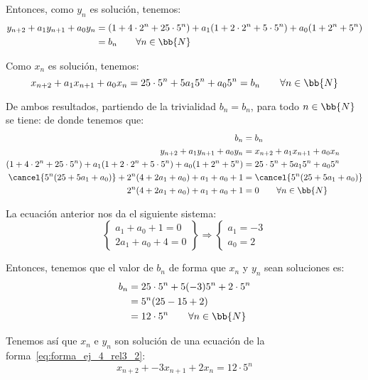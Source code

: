 \begin{ejercicio}
    Entonces, como $y_n$ es solución, tenemos:
    \begin{align*}
        y_{n+2} + a_1 y_{n+1} + a_0 y_n &= (1+4\cdot 2^n + 25\cdot 5^n) + a_1(1+2\cdot 2^n + 5\cdot 5^n) + a_0 (1 + 2^n + 5^n) \\
        &= b_n \qquad \forall n \in \bb{N}
    \end{align*}
    
    Como $x_n$ es solución, tenemos:
    \begin{equation*}
        x_{n+2} + a_1 x_{n+1} + a_0 x_n = 25\cdot 5^n + 5a_15^n + a_0 5^n = b_n \qquad \forall n \in \bb{N}
    \end{equation*}

    De ambos resultados, partiendo de la trivialidad $b_n=b_n$, para todo $n\in \bb{N}$ se tiene:
    de donde tenemos que:
    \begin{align*}
        b_n &= b_n \\
        y_{n+2} + a_1y_{n+1} + a_0 y_n &= x_{n+2} + a_1x_{n+1} + a_0 x_n   \\
        (1+4\cdot 2^n + 25\cdot 5^n) + a_1(1+2\cdot 2^n + 5\cdot 5^n) +
         a_0 (1 + 2^n + 5^n) &= 25\cdot 5^n + 5a_15^n + a_0 5^n \\
        \cancel{5^n(25+5a_1 + a_0)} + 2^n (4+2a_1 + a_0)+
         a_1 + a_0 + 1 &= \cancel{5^n(25 + 5a_1 + a_0)} \\
        2^n (4+2a_1 + a_0) + a_1 + a_0 + 1 &= 0 \qquad \forall n \in \bb{N}
    \end{align*}

    La ecuación anterior nos da el siguiente sistema:
    \begin{equation*}
        \left\{\begin{array}{l}
            a_1 + a_0 + 1 = 0 \\
            2a_1 + a_0 + 4 = 0
        \end{array}\right\}
        \Longrightarrow
        \left\{\begin{array}{l}
            a_1 = -3\\
            a_0 = 2
        \end{array}\right.
    \end{equation*}

    Entonces, tenemos que el valor de $b_n$ de forma que $x_n$ y $y_n$ sean soluciones es:
    \begin{align*}
        b_n &= 25\cdot 5^n + 5(-3)5^n + 2\cdot 5^n \\
        &= 5^n ( 25 -15 + 2) \\
        &= 12\cdot 5^n \qquad \forall n \in \bb{N}
    \end{align*}

    Tenemos así que $x_n$ e $y_n$ son solución de una ecuación de la forma~\ref{eq:forma_ej_4_rel3_2}:
    \begin{equation*}
        x_{n+2} + -3x_{n+1} + 2 x_n = 12\cdot 5^n
    \end{equation*}
\end{ejercicio}

